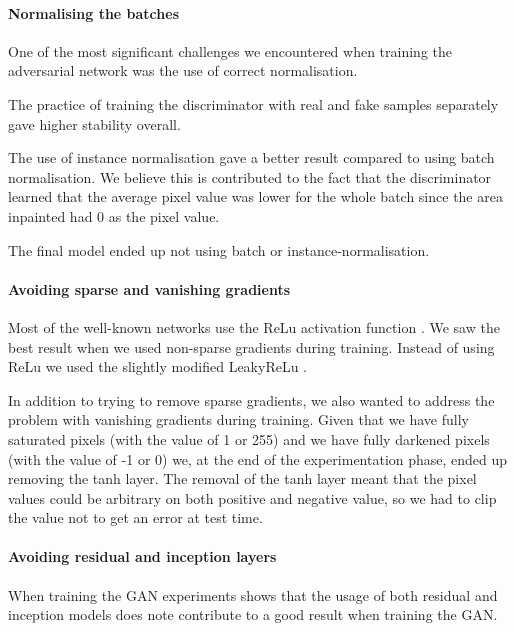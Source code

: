\paragraph{Normalising the batches}
One of the most significant challenges we encountered when training the adversarial network was the use of correct normalisation. 

The practice of training the discriminator with real and fake samples separately gave higher stability overall. 

The use of instance normalisation gave a better result compared to using batch normalisation. We believe this is contributed to the fact that the discriminator learned that the average pixel value was lower for the whole batch since the area inpainted had 0 as the pixel value.

The final model ended up not using batch or instance-normalisation. 



\paragraph{Avoiding sparse and vanishing gradients}
Most of the well-known networks use the ReLu\cite{Nair/2010/RLU/3104322.3104425} activation function \cite{DBLP:journals/corr/SimonyanZ14a} \cite{DBLP:journals/corr/SzegedyIV16} 
\cite{DBLP:journals/corr/HeZRS15}.
We saw the best result when we used non-sparse gradients during training. 
Instead of using ReLu we used the slightly modified LeakyReLu \cite{Maas2013RectifierNI}.


In addition to trying to remove sparse gradients, we also wanted to address the problem with vanishing gradients during training. Given that we have fully saturated pixels (with the value of 1 or 255) and we have fully darkened pixels (with the value of -1 or 0) we, at the end of the experimentation phase, ended up removing the tanh layer. 
The removal of the tanh layer meant that the pixel values could be arbitrary on both positive and negative value, so we had to clip the value not to get an error at test time. 



\paragraph{Avoiding residual and inception layers}
When training the GAN experiments shows that the usage of both residual \cite{Rumelhart:1986:LIR:104279.104293} and inception \cite{DBLP:journals/corr/SzegedyLJSRAEVR14} models does note contribute to a good result when training the GAN.

